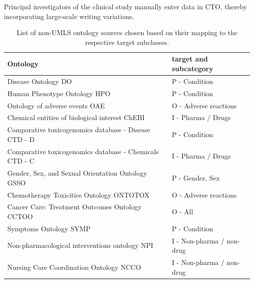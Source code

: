 \documentclass[10.7pt,]{article}
\begin{document}
Principal investigators of the clinical study manually enter data in CTO, thereby incorporating large-scale writing variations.  
%
%
%
\begin{table}[!ht]
    \centering
    \begin{tabular}{|l|l|}
    \hline
        Ontology & target and subcategory \\ 
    \hline
        Disease Ontology DO & P - Condition \\ 
        Human Phenotype Ontology HPO & P - Condition \\ 
        Ontology of adverse events OAE & O - Adverse reactions \\ 
        Chemical entities of biological interest ChEBI & I - Pharma / Drugs \\ 
        Comparative toxicogenomics database - Disease CTD - D & P - Condition \\ 
        Comparative toxicogenomics database - Chemicals CTD - C & I - Pharma / Drugs \\ 
        Gender, Sex, and Sexual Orientation Ontology GSSO & P - Gender, Sex \\ 
        Chemotherapy Toxicities Ontology ONTOTOX & O - Adverse reactions \\ 
        Cancer Care: Treatment Outcomes Ontology CCTOO & O - All \\ 
        Symptoms Ontology SYMP & P - Condition \\ 
        Non-pharmacological interventions ontology NPI & I - Non-pharma / non-drug \\ 
        Nursing Care Coordination Ontology NCCO & I - Non-pharma / non-drug \\ \hline
    \end{tabular}
    \caption{\label{tab:source2targets} List of non-UMLS ontology sources chosen based on their mapping to the respective target subclasses.}
\end{table}
%
%
%
\end{document}
